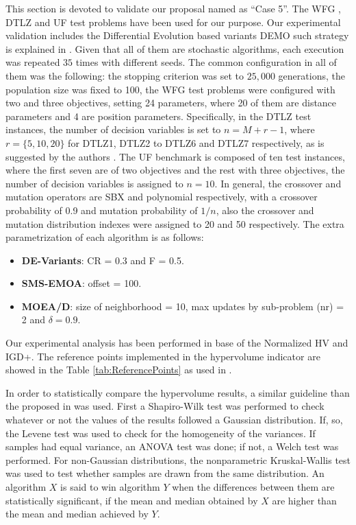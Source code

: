 This section is devoted to validate our proposal named as ``Case 5''.
%
The WFG \cite{Joel:WFG}, DTLZ \cite{Joel:DTLZ_2} and UF \cite{zhang2009performance} test problems have been used for our purpose.
%
Our experimental validation includes the Differential Evolution based variants DEMO such strategy is explained in \cite{tuvsar2007differential}.
%
Given that all of them are stochastic algorithms, each execution was repeated $35$ times with different seeds.
%
The common configuration in all of them was the following: the stopping criterion was set to $25,000$ generations, the population size was fixed to 100, the WFG test problems were configured with two and three objectives, setting 24 parameters, where 20 of them are distance parameters and 4 are position parameters.
%
Specifically, in the DTLZ test instances, the number of decision variables is set to $n=M+r-1$, where $r=\{5, 10, 20\}$ for DTLZ1, DTLZ2 to DTLZ6 and DTLZ7 respectively, as is suggested by the authors \cite{Joel:DTLZ_2}.  
% 
The UF benchmark is composed of ten test instances, where the first seven are of two objectives and the rest with three objectives, the number of decision variables is assigned to $n=10$.
%
In general, the crossover and mutation operators are SBX and polynomial respectively, with a crossover probability of 0.9 and mutation probability of $1/n$, also the crossover and mutation distribution indexes were assigned to 20 and 50 respectively.
%
The extra parametrization of each algorithm is as follows:
\begin{itemize}
\item \textbf{DE-Variants}: CR = 0.3 and F = 0.5.
\item \textbf{SMS-EMOA}: offset = 100.
\item \textbf{MOEA/D}: size of neighborhood = 10, max updates by sub-problem (nr) = 2 and $\delta = 0.9$.
\end{itemize}
%
Our experimental analysis has been performed in base of the Normalized HV and IGD+.
%
The reference points implemented in the hypervolume indicator are showed in the Table \ref{tab:ReferencePoints} as used in \cite{Joel:Kuhn_Munkres, Joel:OperatorAHX}.


In order to statistically compare the hypervolume results, a similar guideline than the proposed in \cite{Joel:StatisticalTest} was used. 
%
First a Shapiro-Wilk test was performed to check whatever or not the values of the results followed a Gaussian distribution. 
%
If, so, the Levene test was used to check for the homogeneity of the variances. 
%
If samples had equal variance, an ANOVA test was done; if not, a Welch test was performed. 
%
For non-Gaussian distributions, the nonparametric Kruskal-Wallis test was used to test whether samples are drawn from the same distribution. 
%
An algorithm $X$ is said to win algorithm $Y$ when the differences between them are statistically significant, if the mean and median obtained by $X$ are higher than the mean and median achieved by $Y$.
%

